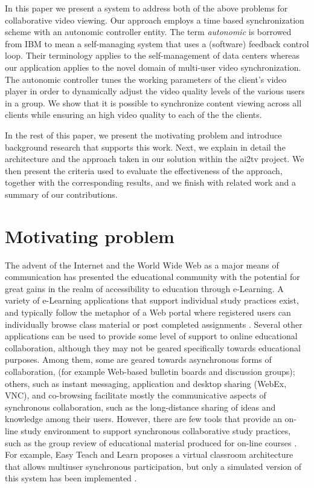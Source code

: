 \documentclass{sig-alternate}
\begin{document}
In this paper we present a system to address both of the above
problems for collaborative video viewing.  Our approach employs a time
based synchronization scheme with an autonomic controller entity.  The
term \textit{autonomic} is borrowed from IBM to mean a self-managing
system that uses a (software) feedback control loop\cite{IBM}.  Their
terminology applies to the self-management of data centers whereas our
application applies to the novel domain of multi-user video
synchronization.  The autonomic controller tunes the working
parameters of the client's video player in order to dynamically adjust
the video quality levels of the various users in a group.  We show
that it is possible to synchronize content viewing across all clients
while ensuring an high video quality to each of the the clients.

In the rest of this paper, we present the motivating problem and
introduce background research that supports this work.  Next, we
explain in detail the architecture and the approach taken in our
solution within the ai2tv project.  We then present the criteria used
to evaluate the effectiveness of the approach, together with the
corresponding results, and we finish with related work and a summary
of our contributions.

\section{Motivating problem} \label{background}
The advent of the Internet and the World Wide Web as a major means of
communication has presented the educational community with the
potential for great gains in the realm of accessibility to education
through e-Learning.  A variety of e-Learning applications that support
individual study practices exist, and typically follow the metaphor of
a Web portal where registered users can individually browse class
material or post completed assignments \cite{PHOENIX,CAPELLA}.
Several other applications can be used to provide some level of
support to online educational collaboration, although they may not be
geared specifically towards educational purposes.  Among them, some
are geared towards asynchronous forms of collaboration, (for example
Web-based bulletin boards and discussion groups); others, such as
instant messaging, application and desktop sharing (WebEx, VNC), and
co-browsing \cite{CAPPS, LIEBERMAN, SIDLER} facilitate mostly the
communicative aspects of synchronous collaboration, such as the
long-distance sharing of ideas and knowledge among their users.
However, there are few tools that provide an on-line study environment
to support synchronous collaborative study practices, such as the
group review of educational material produced for on-line courses
\cite{WELLS}.  For example, Easy Teach and Learn proposes a virtual
classroom architecture that allows multiuser synchronous
participation, but only a simulated version of this system has been
implemented \cite{WALTER}.
\end{document}
